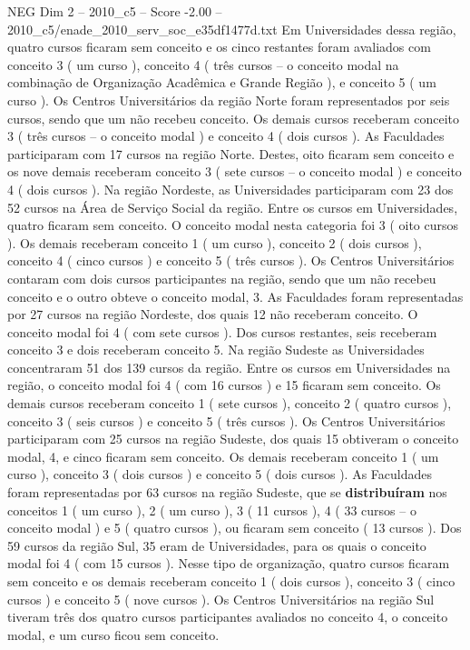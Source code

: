 \begin{textsample}{NEG Dim 2 – 2010\_c5 – Score -2.00 – 2010\_c5/enade\_2010\_serv\_soc\_e35df1477d.txt}
Em Universidades dessa região, quatro cursos ficaram sem conceito e os cinco restantes foram avaliados com conceito 3 ( um curso ), conceito 4 ( três cursos – o conceito modal na combinação de Organização Acadêmica e Grande Região ), e conceito 5 ( um curso ).
Os Centros Universitários da região Norte foram representados por seis cursos, sendo que um não recebeu conceito.
Os demais cursos receberam conceito 3 ( três cursos – o conceito modal ) e conceito 4 ( dois cursos ).
As Faculdades participaram com 17 cursos na região Norte.
Destes, oito ficaram sem conceito e os nove demais receberam conceito 3 ( sete cursos – o conceito modal ) e conceito 4 ( dois cursos ).
Na região Nordeste, as Universidades participaram com 23 dos 52 cursos na Área de Serviço Social da região.
Entre os cursos em Universidades, quatro ficaram sem conceito.
O conceito modal nesta categoria foi 3 ( oito cursos ).
Os demais receberam conceito 1 ( um curso ), conceito 2 ( dois cursos ), conceito 4 ( cinco cursos ) e conceito 5 ( três cursos ).
Os Centros Universitários contaram com dois cursos participantes na região, sendo que um não recebeu conceito e o outro obteve o conceito modal, 3.
As Faculdades foram representadas por 27 cursos na região Nordeste, dos quais 12 não receberam conceito.
O conceito modal foi 4 ( com sete cursos ).
Dos cursos restantes, seis receberam conceito 3 e dois receberam conceito 5.
Na região Sudeste as Universidades concentraram 51 dos 139 cursos da região.
Entre os cursos em Universidades na região, o conceito modal foi 4 ( com 16 cursos ) e 15 ficaram sem conceito.
Os demais cursos receberam conceito 1 ( sete cursos ), conceito 2 ( quatro cursos ), conceito 3 ( seis cursos ) e conceito 5 ( três cursos ).
Os Centros Universitários participaram com 25 cursos na região Sudeste, dos quais 15 obtiveram o conceito modal, 4, e cinco ficaram sem conceito.
Os demais receberam conceito 1 ( um curso ), conceito 3 ( dois cursos ) e conceito 5 ( dois cursos ).
As Faculdades foram representadas por 63 cursos na região Sudeste, que se \textbf{distribuíram} nos conceitos 1 ( um curso ), 2 ( um curso ), 3 ( 11 cursos ), 4 ( 33 cursos – o conceito modal ) e 5 ( quatro cursos ), ou ficaram sem conceito ( 13 cursos ).
Dos 59 cursos da região Sul, 35 eram de Universidades, para os quais o conceito modal foi 4 ( com 15 cursos ).
Nesse tipo de organização, quatro cursos ficaram sem conceito e os demais receberam conceito 1 ( dois cursos ), conceito 3 ( cinco cursos ) e conceito 5 ( nove cursos ).
Os Centros Universitários na região Sul tiveram três dos quatro cursos participantes avaliados no conceito 4, o conceito modal, e um curso ficou sem conceito.

\end{textsample}
